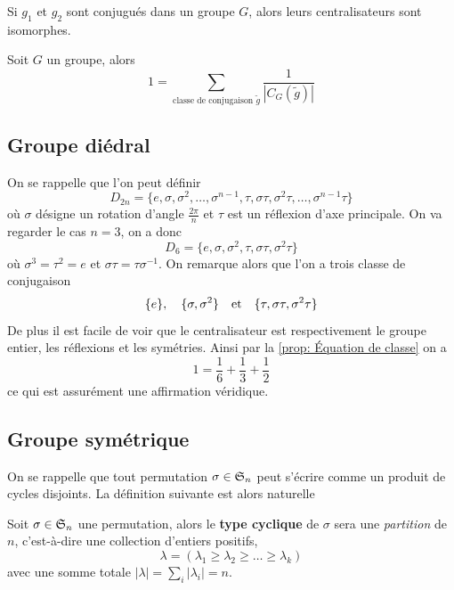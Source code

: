 \begin{proposition}
	Si $g_1$ et $g_2$ sont conjugués dans un groupe $G$, alors leurs centralisateurs sont isomorphes.
\end{proposition}


\begin{proposition} \label{prop: Équation de classe}
	Soit $G$ un groupe, alors
	\[
	1 = \sum_{\text{classe de conjugaison } \tilde g} \frac1{|C_G(\tilde g)|}
	\]
\end{proposition}


\subsection{Groupe diédral}
On se rappelle que l'on peut définir
\[
D_{2n} = \{e, \sigma, \sigma^2, \ldots, \sigma^{n-1}, \tau, \sigma \tau, \sigma^2 \tau, \ldots, \sigma^{n-1} \tau\}
\]
où $\sigma$ désigne un rotation d'angle $\frac{2\pi}{n}$ et $\tau$ est un réflexion d'axe principale. On va regarder le cas $n=3$, on a donc
\[
D_6 = \{e, \sigma, \sigma^2, \tau, \sigma \tau, \sigma^2 \tau\}
\]
où $\sigma^3 = \tau^2 = e$ et $\sigma \tau = \tau \sigma^{-1}$. On remarque alors que l'on a trois classe de conjugaison
\[
\{e\}, \quad \{\sigma, \sigma^2\} \et \{\tau, \sigma \tau, \sigma^2 \tau\}
\]
De plus il est facile de voir que le centralisateur est respectivement le groupe entier, les réflexions et les symétries. Ainsi par la \autoref{prop: Équation de classe} on a
\[
1 = \frac16 + \frac13 + \frac12
\]
ce qui est assurément une affirmation véridique.

\subsection{Groupe symétrique}
On se rappelle que tout permutation $\sigma \in \S_n$ peut s'écrire comme un produit de cycles disjoints. La définition suivante est alors naturelle
\begin{definition}
	Soit $\sigma \in \S_n$ une permutation, alors le \textbf{type cyclique} de $\sigma$ sera une \emph{partition} de $n$, c'est-à-dire une collection d'entiers positifs,
	\[
	\lambda = (\lambda_1 \geqslant \lambda_2 \geqslant \ldots \geqslant \lambda_k)
	\]
	avec une somme totale $|\lambda| = \sum_i |\lambda_i| = n$.
\end{definition}


